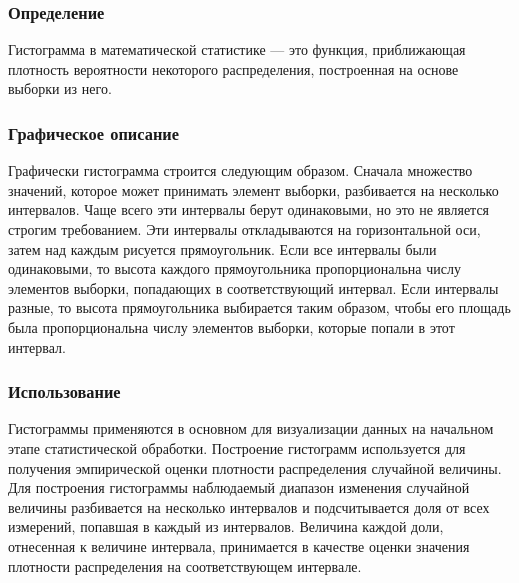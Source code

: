 \documentclass[a4]{article}
\begin{document}
			\subsubsection{Определение}
				Гистограмма в математической статистике — это функция, приближающая
				плотность вероятности некоторого распределения, построенная на основе
				выборки из него.

		
			\subsubsection{Графическое описание}
				Графически гистограмма строится следующим образом. Сначала множество значений, которое может принимать элемент выборки, разбивается на
				несколько интервалов. Чаще всего эти интервалы берут одинаковыми, но
				это не является строгим требованием. Эти интервалы откладываются на
				горизонтальной оси, затем над каждым рисуется прямоугольник. Если все
				интервалы были одинаковыми, то высота каждого прямоугольника пропорциональна числу элементов выборки, попадающих в соответствующий
				интервал. Если интервалы разные, то высота прямоугольника выбирается
				таким образом, чтобы его площадь была пропорциональна числу элементов
				выборки, которые попали в этот интервал.
			\subsubsection{Использование}
				Гистограммы применяются в основном для визуализации данных на начальном этапе статистической обработки.
				Построение гистограмм используется для получения эмпирической оценки
				плотности распределения случайной величины. Для построения гистограммы наблюдаемый диапазон изменения случайной величины разбивается на
				несколько интервалов и подсчитывается доля от всех измерений, попавшая
				в каждый из интервалов. Величина каждой доли, отнесенная к величине
				интервала, принимается в качестве оценки значения плотности распределения на соответствующем интервале.
				
\end{document}
